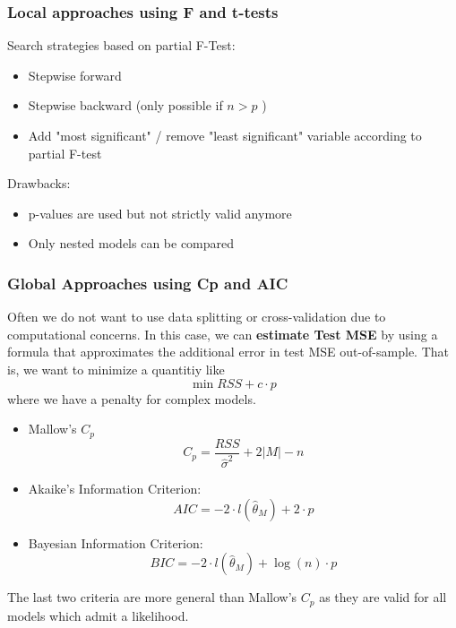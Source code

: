 \documentclass[11pt, %
	oneside, %
	english, %
	onehalfspacing, %
	]{article} %
\numberwithin{equation}{section}
\begin{document}
\subsubsection*{Local approaches using F and t-tests}

Search strategies based on partial F-Test:

\begin{itemize}
	\item Stepwise forward
	\item Stepwise backward (only possible if $n>p$ )
	\item Add "most significant" / remove "least significant" variable according to partial F-test
\end{itemize}

Drawbacks:

\begin{itemize}
	\item p-values are used but not strictly valid anymore
	\item Only nested models can be compared
\end{itemize}

\subsubsection*{Global Approaches using Cp and AIC}

Often we do not want to use data splitting or cross-validation due to computational concerns. In this case, we can \textbf{estimate Test MSE} by using a formula that approximates the additional error in test MSE out-of-sample. That is, we want to minimize a quantitiy like
$$
\min RSS + c \cdot p
$$
where we have a penalty for complex models.


\begin{itemize}
    \item Mallow's $C_p$
    $$C_p=\frac{R S S}{\hat{\sigma}^2}+2|M|-n$$

    \item Akaike's Information Criterion:
    $$A I C=-2 \cdot l\left(\hat{\theta}_M\right)+2 \cdot p$$

    \item Bayesian Information Criterion:
    $$BIC=-2 \cdot l\left(\hat{\theta}_M\right)+\log (n) \cdot p$$
\end{itemize}

The last two criteria are more general than Mallow's $C_p$ as they are valid for all models which admit a likelihood.
\end{document}
